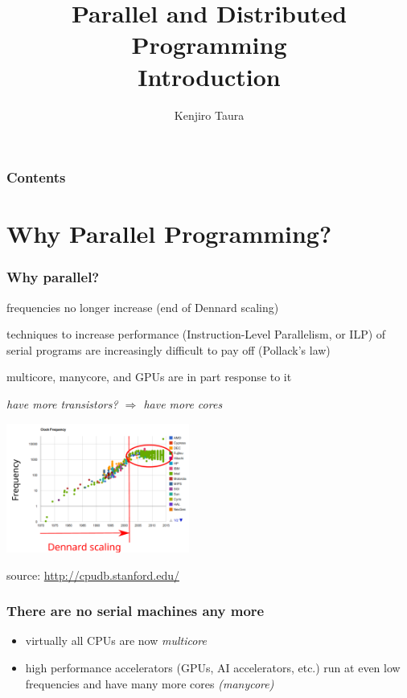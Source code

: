 \documentclass[12pt,dvipdfmx]{beamer}
\title{Parallel and Distributed Programming \\ Introduction}
\institute{}
\author{Kenjiro Taura}
\date{}
\newcommand{\ao}[1]{{\color{blue}#1}}
\begin{document}
\maketitle

\begin{frame}
\frametitle{Contents}
\tableofcontents
\end{frame}

\section{Why Parallel Programming?}

\begin{frame}
\frametitle{Why parallel?}
\begin{itemize}
\item<1-> frequencies no longer increase \ao{(end of Dennard scaling)}
\item<2-> techniques to increase performance 
  (Instruction-Level Parallelism, or ILP) of serial programs are increasingly
  difficult to pay off \ao{(Pollack's law)}
\item<3-> multicore, manycore, and GPUs are in part response to it
  \begin{center}
  \item \ao{\textit{have more transistors? $\Rightarrow$ have more cores}}
  \end{center}
\end{itemize}

\begin{center}
  \includegraphics[width=0.45\textwidth]{out/pdf/svg/frequency.pdf}
    
  source: \url{http://cpudb.stanford.edu/}
\end{center}
\end{frame}

\begin{frame}
\frametitle{There are no serial machines any more}
\begin{itemize}
\item virtually all CPUs are now \ao{\textit{multicore}}
\item high performance accelerators (GPUs, AI accelerators, etc.) run at
  even low frequencies and have many more cores \ao{\textit{(manycore)}}
\end{itemize}
\end{frame}
\end{document}
